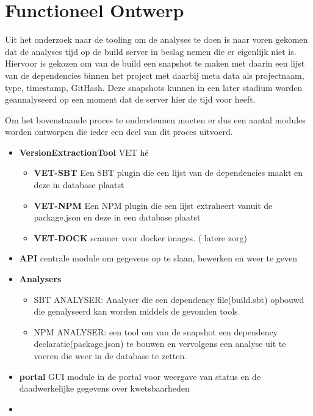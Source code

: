 \chapter{Functioneel Ontwerp}\label{ch:functioneel-ontwerp} %

\label{funtioneelOntwerp} %

Uit het onderzoek naar de tooling om de analyses te doen is naar voren gekomen dat de analyses tijd op de build server in beslag nemen die er eigenlijk niet is. Hiervoor is gekozen om van de build een snapshot te maken met daarin een lijst van de dependencies binnen het project met daarbij meta data als projectnaam, type, timestamp, GitHash. Deze snapshots kunnen in een later stadium worden geannalyseerd op een moment dat de server hier de tijd voor heeft.

Om het bovenstaande proces te ondersteunen moeten er dus een aantal modules worden ontworpen die ieder een deel van dit proces uitvoerd.
\begin{itemize}
    \item \textbf{VersionExtractionTool} VET hé
    \begin{itemize}
        \item \textbf{VET-SBT} Een SBT plugin die een lijst van de dependencies maakt en deze in database plaatst
        \item \textbf{VET-NPM} Een NPM plugin die een lijst extraheert vanuit de package.json en deze in een database plaatst
        \item \textbf{VET-DOCK} scanner voor docker images. ( latere zorg)
    \end{itemize}
    \item \textbf{API} centrale module om gegevens op te slaan, bewerken en weer te geven
    \item \textbf{Analysers}
    \begin{itemize}
        \item SBT ANALYSER: Analyser die een dependency file(build.sbt) opbouwd die genalyseerd kan worden middels de gevonden tools
        \item NPM ANALYSER: een tool om van de snapshot een dependency declaratie(package.json) te bouwen en vervolgens een analyse uit te voeren die weer in de database te zetten.
    \end{itemize}

    \item \textbf{portal} GUI module in de portal voor weergave van status en de daadwerkelijke gegevens over kwetsbaarheden
    \item
\end{itemize}



